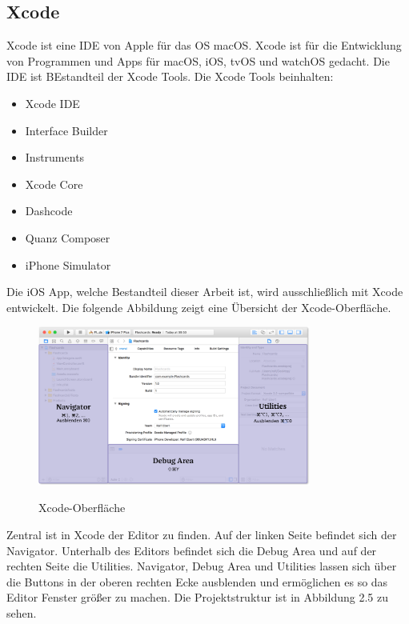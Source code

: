 \subsection{Xcode}
Xcode ist eine \acl{IDE} von Apple für das \acs{OS} macOS. Xcode ist für die Entwicklung von Programmen und Apps für macOS, iOS, tvOS und watchOS gedacht. 
Die \acs{IDE} ist BEstandteil der Xcode Tools. 
\newline
Die Xcode Tools beinhalten:
\begin{itemize}
	\item Xcode \acs{IDE}
	\item Interface Builder
	\item Instruments
	\item Xcode Core
	\item Dashcode
	\item Quanz Composer
	\item iPhone Simulator
\end{itemize}
Die iOS App, welche Bestandteil dieser Arbeit ist, wird ausschließlich mit Xcode entwickelt.
Die folgende Abbildung zeigt eine Übersicht der Xcode-Oberfläche.
\begin{figure}[H]
	\begin{center}
		{\includegraphics[width=0.8\textwidth]{images/xcode_views.png}}
		\caption{Xcode-Oberfläche \cite{Xcode.Ebert}}
	\end{center}
\end{figure}
Zentral ist in Xcode der Editor zu finden. Auf der linken Seite befindet sich der Navigator. Unterhalb des Editors befindet sich die Debug Area und auf der rechten Seite die Utilities. Navigator, Debug Area und Utilities lassen sich über die Buttons in der oberen rechten Ecke ausblenden und ermöglichen es so das Editor Fenster größer zu machen.
\newline
Die Projektstruktur ist in Abbildung 2.5 zu sehen. \cite{Xcode.Ebert} \cite{Xcode.Wiki} \cite{Xcode.Apple} 

